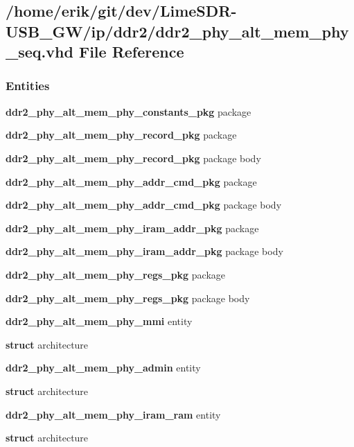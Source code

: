 \subsection{/home/erik/git/dev/\+Lime\+S\+D\+R-\/\+U\+S\+B\+\_\+\+G\+W/ip/ddr2/ddr2\+\_\+phy\+\_\+alt\+\_\+mem\+\_\+phy\+\_\+seq.vhd File Reference}
\label{ddr2__phy__alt__mem__phy__seq_8vhd}
\subsubsection*{Entities}
\begin{DoxyCompactItemize}
\item 
{\bf ddr2\+\_\+phy\+\_\+alt\+\_\+mem\+\_\+phy\+\_\+constants\+\_\+pkg} package
\item 
{\bf ddr2\+\_\+phy\+\_\+alt\+\_\+mem\+\_\+phy\+\_\+record\+\_\+pkg} package
\item 
{\bf ddr2\+\_\+phy\+\_\+alt\+\_\+mem\+\_\+phy\+\_\+record\+\_\+pkg} package body
\item 
{\bf ddr2\+\_\+phy\+\_\+alt\+\_\+mem\+\_\+phy\+\_\+addr\+\_\+cmd\+\_\+pkg} package
\item 
{\bf ddr2\+\_\+phy\+\_\+alt\+\_\+mem\+\_\+phy\+\_\+addr\+\_\+cmd\+\_\+pkg} package body
\item 
{\bf ddr2\+\_\+phy\+\_\+alt\+\_\+mem\+\_\+phy\+\_\+iram\+\_\+addr\+\_\+pkg} package
\item 
{\bf ddr2\+\_\+phy\+\_\+alt\+\_\+mem\+\_\+phy\+\_\+iram\+\_\+addr\+\_\+pkg} package body
\item 
{\bf ddr2\+\_\+phy\+\_\+alt\+\_\+mem\+\_\+phy\+\_\+regs\+\_\+pkg} package
\item 
{\bf ddr2\+\_\+phy\+\_\+alt\+\_\+mem\+\_\+phy\+\_\+regs\+\_\+pkg} package body
\item 
{\bf ddr2\+\_\+phy\+\_\+alt\+\_\+mem\+\_\+phy\+\_\+mmi} entity
\item 
{\bf struct} architecture
\item 
{\bf ddr2\+\_\+phy\+\_\+alt\+\_\+mem\+\_\+phy\+\_\+admin} entity
\item 
{\bf struct} architecture
\item 
{\bf ddr2\+\_\+phy\+\_\+alt\+\_\+mem\+\_\+phy\+\_\+iram\+\_\+ram} entity
\item 
{\bf struct} architecture
\item 

\end{DoxyCompactItemize}
